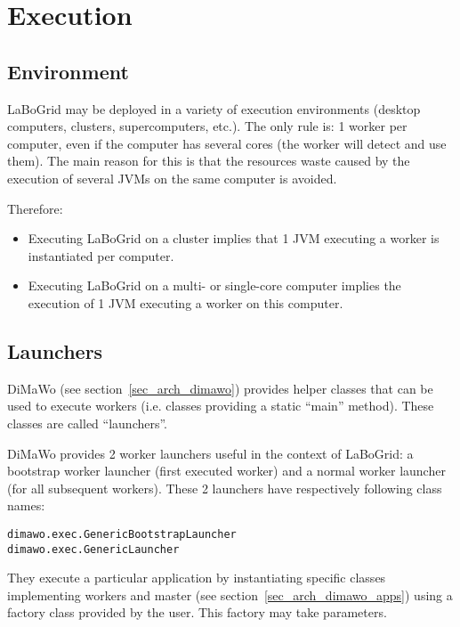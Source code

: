 \chapter{Execution}
\label{sec_exec}

\section{Environment}

LaBoGrid may be deployed in a variety of execution environments (desktop
computers, clusters, supercomputers, etc.). The only rule is: 1 worker per
computer, even if the computer has several cores (the worker will detect and
use them). The main reason for this is that the resources waste caused by the
execution of several JVMs on the same computer is avoided.

Therefore:
\begin{itemize}
	\item Executing LaBoGrid on a cluster implies that 1 JVM executing a worker
	is instantiated per computer.
	\item Executing LaBoGrid on a multi- or single-core computer implies the
	execution of 1 JVM executing a worker on this computer.
\end{itemize}


\section{Launchers}

DiMaWo (see section~\ref{sec_arch_dimawo}) provides helper classes that can be
used to execute workers (i.e. classes providing a static ``main'' method).
These classes are called ``launchers''.

DiMaWo provides 2 worker launchers useful in the context of LaBoGrid: a
bootstrap worker launcher (first executed worker) and a normal worker launcher
(for all subsequent workers). These 2 launchers have respectively following
class names:

\begin{center}
\texttt{dimawo.exec.GenericBootstrapLauncher}\\
\texttt{dimawo.exec.GenericLauncher}
\end{center}

They execute a particular application by instantiating specific
classes implementing workers and master (see
section~\ref{sec_arch_dimawo_apps}) using a factory class provided by the user.
This factory may take parameters.


